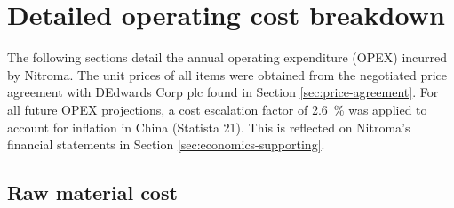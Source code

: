 \section{Detailed operating cost breakdown}
The following sections detail the annual operating expenditure (OPEX) incurred by Nitroma. The unit prices of all items were obtained from the negotiated price agreement with DEdwards Corp plc found in Section \ref{sec:price-agreement}. For all future OPEX projections, a cost escalation factor of \SI{2.6}{\percent} was applied to account for inflation in China (Statista 21). This is reflected on Nitroma’s financial statements in Section \ref{sec:economics-supporting}.

\subsection{Raw material cost}
\label{sec:opex-raw-material}

